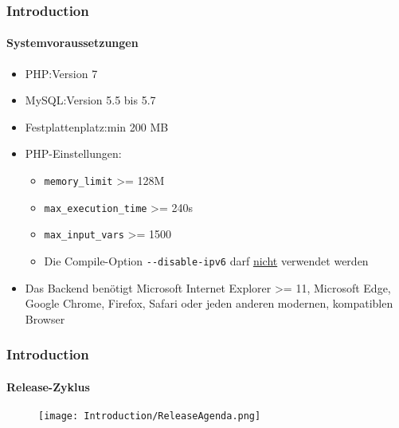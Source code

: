 \begin{frame}[fragile]
	\frametitle{Introduction}
	\framesubtitle{Systemvoraussetzungen}

	\begin{itemize}
		\item PHP:\tabto{2.2cm}Version 7
		\item MySQL:\tabto{2.2cm}Version 5.5 bis 5.7
		\item Festplattenplatz:\tabto{2.2cm}min 200 MB
		\item PHP-Einstellungen:

			\begin{itemize}
				\item \texttt{memory\_limit} >= 128M
				\item \texttt{max\_execution\_time} >= 240s
				\item \texttt{max\_input\_vars} >= 1500
				\item Die Compile-Option \texttt{-}\texttt{-disable-ipv6} darf \underline{nicht} verwendet werden
			\end{itemize}

		\item Das Backend benötigt Microsoft Internet Explorer >= 11, Microsoft Edge, Google Chrome, Firefox, Safari oder jeden anderen modernen, kompatiblen Browser

	\end{itemize}

\end{frame}

\begin{frame}[fragile]
	\frametitle{Introduction}
	\framesubtitle{Release-Zyklus}

	\begin{figure}
		\texttt{[image: Introduction/ReleaseAgenda.png]}
	\end{figure}

\end{frame}

